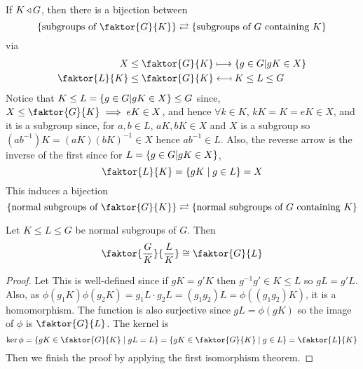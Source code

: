 \documentclass{article}
\begin{document}
If $K \operatorname{\triangleleft} G$, then there is a bijection between $$ \crbkt{\text{subgroups of } \faktor{G}{K}} \rightleftarrows \crbkt{\text{subgroups of } G \text{ containing } K} $$
via
\begin{align*}
    X \leq \faktor{G}{K} &\longmapsto \crbkt{g \in G | gK \in X} \\
    \faktor{L}{K} \leq \faktor{G}{K} &\longmapsfrom K \leq L \leq G
\end{align*}
Notice that $K \leq L = \left\{ g \in G | gK \in X \right\} \leq G$ since, $X \leq \faktor{G}{K} \implies eK \in X$,
and hence $\forall k \in K$, $kK = K = eK \in X$, and it is a subgroup since, 
for $a, b \in L$, $aK, bK \in X$ and $X$ is a subgroup so $(ab^{-1})K = (aK)(bK)^{-1} \in X$ hence $ab^{-1} \in L$.
Also, the reverse arrow is the inverse of the first since for $L = \left\{ g \in G | gK \in X \right\}$, $$ \faktor{L}{K} = \crbkt{gK \mid g \in L} = X $$
This induces a bijection $$ \crbkt{\text{normal subgroups of } \faktor{G}{K}} \rightleftarrows \crbkt{\text{normal subgroups of } G \text{ containing } K}$$

\begin{thm}
    Let $K \leq L \leq G$ be normal subgroups of $G$. Then $$ \faktor{\frac{G}{K}}{\frac{L}{K}} \cong \faktor{G}{L}$$
\end{thm}


\begin{proof}
    Let 
    This is well-defined since if $gK = g'K$ then $g^{-1}g' \in K \leq L$ so $gL = g'L$. 
    Also, as $\phi(g_1K)\phi(g_2K) = g_1L \cdot g_2L = (g_1g_2)L = \phi((g_1g_2)K)$, it is a homomorphism.
    The function is also surjective since $gL = \phi(gK)$ so the image of $\phi$ is $\faktor{G}{L}$.
    The kernel is $$ \ker \phi = \crbkt{gK \in \faktor{G}{K} \mid gL = L} = \crbkt{gK \in \faktor{G}{K} \mid g \in L} = \faktor{L}{K}$$
    Then we finish the proof by applying the first isomorphism theorem.
\end{proof}
\end{document}
